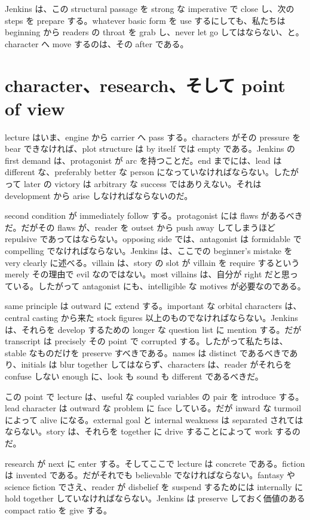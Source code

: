 Jenkins は、この structural passage を strong な imperative で close し、次の steps を prepare する。whatever basic form を use するにしても、私たちは beginning から readers の throat を grab し、never let go してはならない、と。character へ move するのは、その after である。

\section{character、research、そして point of view}

lecture はいま、engine から carrier へ pass する。characters がその pressure を bear できなければ、plot structure は by itself では empty である。Jenkins の first demand は、protagonist が arc を持つことだ。end までには、lead は different な、preferably better な person になっていなければならない。したがって later の victory は arbitrary な success ではありえない。それは development から arise しなければならないのだ。

second condition が immediately follow する。protagonist には flaws があるべきだ。だがその flaws が、reader を outset から push away してしまうほど repulsive であってはならない。opposing side では、antagonist は formidable で compelling でなければならない。Jenkins は、ここでの beginner's mistake を very clearly に述べる。villain は、story の slot が villain を require するという merely その理由で evil なのではない。most villains は、自分が right だと思っている。したがって antagonist にも、intelligible な motives が必要なのである。

same principle は outward に extend する。important な orbital characters は、central casting から来た stock figures 以上のものでなければならない。Jenkins は、それらを develop するための longer な question list に mention する。だが transcript は precisely その point で corrupted する。したがって私たちは、stable なものだけを preserve すべきである。names は distinct であるべきであり、initials は blur together してはならず、characters は、reader がそれらを confuse しない enough に、look も sound も different であるべきだ。

この point で lecture は、useful な coupled variables の pair を introduce する。lead character は outward な problem に face している。だが inward な turmoil によって alive になる。external goal と internal weakness は separated されてはならない。story は、それらを together に drive することによって work するのだ。

research が next に enter する。そしてここで lecture は concrete である。fiction は invented である。だがそれでも believable でなければならない。fantasy や science fiction でさえ、reader が disbelief を suspend するためには internally に hold together していなければならない。Jenkins は preserve しておく価値のある compact ratio を give する。

